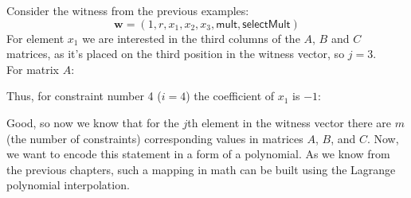 \documentclass[../lecture-notes-148x210.tex]{subfiles}
\begin{document}
\begin{example}
    Consider the witness from the previous examples: 
    \begin{equation*}
        \mathbf{w} = (1, r, x_1, x_2, x_3, \mathsf{mult}, \mathsf{selectMult})
    \end{equation*}
    For element $x_1$ we are interested in the third columns of the $A$, $B$ and $C$ matrices, as
    it's placed on the third position in the witness vector, so $j = 3$.\\
    For matrix $A$:
    \begin{center}
    \end{center}

    Thus, for constraint number 4 ($i = 4$) the coefficient of $x_1$ is $-1$:
    \begin{center}
    \end{center}
\end{example}
Good, so now we know that for the $j$th element in the witness vector there are $m$ (the number of constraints) corresponding values in matrices $A$, $B$, and $C$. Now, we want to encode this statement in a form of a polynomial. 
As we know from the previous chapters, such a mapping in math can be built using the Lagrange polynomial interpolation.
\end{document}
